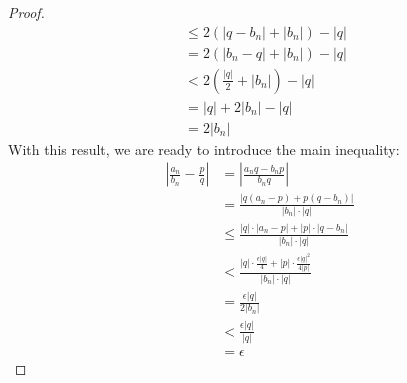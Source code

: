 \documentclass[../main.tex]{subfiles}
\begin{document}
\begin{theorem}
\begin{enumerate}[resume,label={\textup{(}\alph*\textup{)}}]
\begin{proof}
\begin{align*}
                &\leq 2(|q-b_n|+|b_n|)-|q|\\
                &= 2(|b_n-q|+|b_n|)-|q|\\
                &< 2\left( \frac{|q|}{2}+|b_n| \right)-|q|\\
                &= |q|+2|b_n|-|q|\\
                &= 2|b_n|
            \end{align*}
            With this result, we are ready to introduce the main inequality:
            \begin{align*}
                \left| \frac{a_n}{b_n}-\frac{p}{q} \right| &= \left| \frac{a_nq-b_np}{b_nq} \right|\\
                &= \frac{|q(a_n-p)+p(q-b_n)|}{|b_n|\cdot|q|}\\
                &\leq \frac{|q|\cdot|a_n-p|+|p|\cdot|q-b_n|}{|b_n|\cdot|q|}\\
                &< \frac{|q|\cdot\frac{\epsilon|q|}{4}+|p|\cdot\frac{\epsilon|q|^2}{4|p|}}{|b_n|\cdot|q|}\\
                &= \frac{\epsilon|q|}{2|b_n|}\\
                &< \frac{\epsilon|q|}{|q|}\\
                &= \epsilon
            \end{align*}
        \end{proof}
    \end{enumerate}
\end{theorem}
\end{document}
